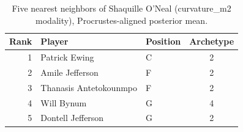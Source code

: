 \begin{table}[htbp]
  \centering\small
  \begin{tabular}{rllc}
    \toprule
    Rank & Player & Position & Archetype \\
    \midrule
    1 & Patrick Ewing & C & 2 \\
    2 & Amile Jefferson & F & 2 \\
    3 & Thanasis Antetokounmpo & F & 2 \\
    4 & Will Bynum & G & 4 \\
    5 & Dontell Jefferson & G & 2 \\
    \bottomrule
  \end{tabular}
  \caption{Five nearest neighbors of Shaquille O'Neal (curvature_m2 modality), Procrustes-aligned posterior mean.}
  \label{tab:Shaquille_O_Neal_neighbors_curvature_m2}
\end{table}


